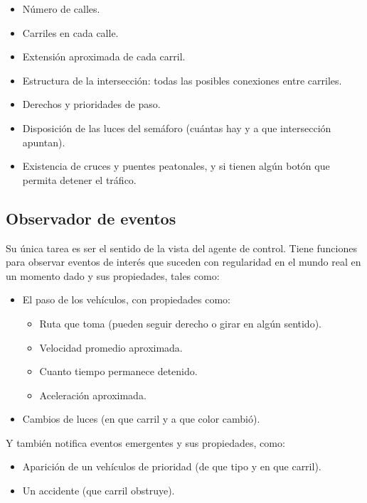 \begin{itemize}
\item
  Número de calles.
\item
  Carriles en cada calle.
\item
  Extensión aproximada de cada carril.
\item
  Estructura de la intersección: todas las posibles conexiones entre
  carriles.
\item
  Derechos y prioridades de paso.
\item
  Disposición de las luces del semáforo (cuántas hay y a que
  intersección apuntan).
\item
  Existencia de cruces y puentes peatonales, y si tienen algún botón que
  permita detener el tráfico.
\end{itemize}

\hypertarget{observador-de-eventos}{%
\subsection{Observador de eventos}\label{observador-de-eventos}}

Su única tarea es ser el sentido de la vista del agente de control.
Tiene funciones para observar eventos de interés que suceden con
regularidad en el mundo real en un momento dado y sus propiedades, tales
como:

\begin{itemize}
\tightlist
\item
  El paso de los vehículos, con propiedades como:

  \begin{itemize}
  \tightlist
  \item
    Ruta que toma (pueden seguir derecho o girar en algún sentido).
  \item
    Velocidad promedio aproximada.
  \item
    Cuanto tiempo permanece detenido.
  \item
    Aceleración aproximada.
  \end{itemize}
\item
  Cambios de luces (en que carril y a que color cambió).
\end{itemize}

Y también notifica eventos emergentes y sus propiedades, como:

\begin{itemize}
\item
  Aparición de un vehículos de prioridad (de que tipo y en que carril).
\item
  Un accidente (que carril obstruye).
\end{itemize}

